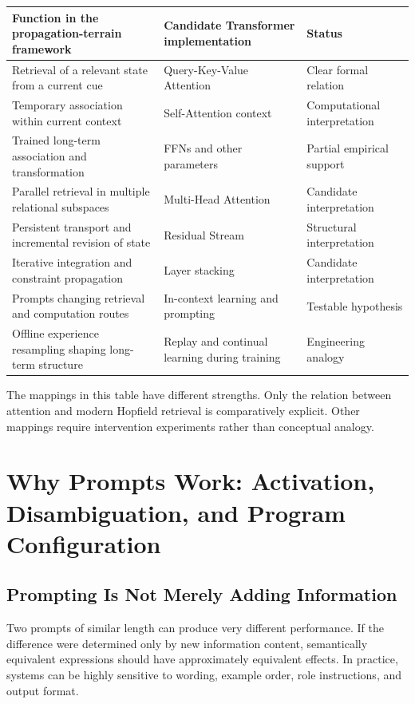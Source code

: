 \documentclass[11pt, a4paper]{article}
\begin{document}
\begin{center}\begin{tabularx}{\textwidth}{X X X}\toprule
\textbf{Function in the propagation-terrain framework} & \textbf{Candidate Transformer implementation} & \textbf{Status} \\
\midrule
Retrieval of a relevant state from a current cue & Query-Key-Value Attention & Clear formal relation \\
Temporary association within current context & Self-Attention context & Computational interpretation \\
Trained long-term association and transformation & FFNs and other parameters & Partial empirical support \\
Parallel retrieval in multiple relational subspaces & Multi-Head Attention & Candidate interpretation \\
Persistent transport and incremental revision of state & Residual Stream & Structural interpretation \\
Iterative integration and constraint propagation & Layer stacking & Candidate interpretation \\
Prompts changing retrieval and computation routes & In-context learning and prompting & Testable hypothesis \\
Offline experience resampling shaping long-term structure & Replay and continual learning during training & Engineering analogy \\
\bottomrule\end{tabularx}\end{center}


The mappings in this table have different strengths. Only the relation between attention and modern Hopfield retrieval is comparatively explicit. Other mappings require intervention experiments rather than conceptual analogy.



\section{Why Prompts Work: Activation, Disambiguation, and Program Configuration}


\subsection{Prompting Is Not Merely Adding Information}


Two prompts of similar length can produce very different performance. If the difference were determined only by new information content, semantically equivalent expressions should have approximately equivalent effects. In practice, systems can be highly sensitive to wording, example order, role instructions, and output format.
\end{document}
